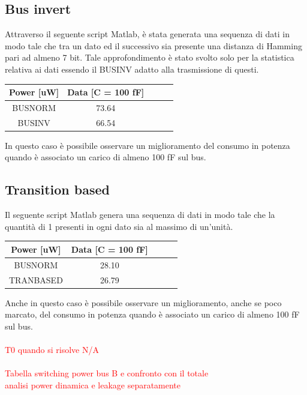 \documentclass[11pt,  english, makeidx, a4paper, titlepage, oneside]{book}
\newenvironment{listato}{\footnotesize} {\normalsize }
\begin{document}
\subsection{Bus invert}
Attraverso il seguente script Matlab, è stata generata una sequenza di dati in modo tale che tra un dato ed il successivo sia presente una distanza di Hamming pari ad almeno 7 bit. Tale approfondimento è stato svolto solo per la statistica relativa ai dati essendo il BUSINV adatto alla trasmissione di questi.
\begin{center}
\begin{listato}
	\centerline{}
\end{listato}
\end{center}
\begin{center}
	\begin{tabular}{|c|c|c|c|c|}
	\hline
	Power [uW] & Data [C = 100 fF]\\
	\hline
	BUSNORM & 73.64\\
	 \hline
	BUSINV & 66.54\\
	\hline
	\end{tabular}	
\end{center}
\vspace{0.3cm}
In questo caso è possibile osservare un miglioramento del consumo in potenza quando è associato un carico di almeno 100 fF sul bus.
\subsection{Transition based}
Il seguente script Matlab genera una sequenza di dati in modo tale che la quantità di 1 presenti in ogni dato sia al massimo di un'unità.
\begin{center}
\begin{listato}
	\centerline{}
\end{listato}
\end{center}
\begin{center}
	\begin{tabular}{|c|c|c|c|c|}
	\hline
	Power [uW] & Data [C = 100 fF]\\
	\hline
	BUSNORM & 28.10\\
	 \hline
	TRANBASED & 26.79\\
	\hline
	\end{tabular}	
\end{center}
\vspace{0.3cm}
Anche in questo caso è possibile osservare un miglioramento, anche se poco marcato, del consumo in potenza quando è associato un carico di almeno 100 fF sul bus.
\\\\
\textcolor{red}{T0 quando si risolve N/A}
\\\\
\textcolor{red}{Tabella switching power bus B e confronto con il totale
\\
analisi power dinamica e leakage separatamente}
\end{document}
